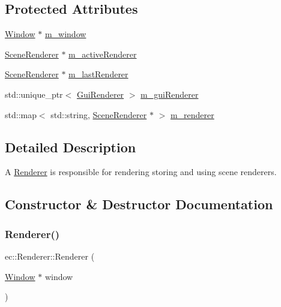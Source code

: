 \subsection*{Protected Attributes}
\begin{DoxyCompactItemize}
\item 
\mbox{\hyperlink{classec_1_1_window}{Window}} $\ast$ \mbox{\hyperlink{classec_1_1_renderer_ac23d74f9d295bf833f095bdff8c8169b}{m\+\_\+window}}
\item 
\mbox{\hyperlink{classec_1_1_scene_renderer}{Scene\+Renderer}} $\ast$ \mbox{\hyperlink{classec_1_1_renderer_a00afed952025d62a654a5f961a55b342}{m\+\_\+active\+Renderer}}
\item 
\mbox{\hyperlink{classec_1_1_scene_renderer}{Scene\+Renderer}} $\ast$ \mbox{\hyperlink{classec_1_1_renderer_a818d84064fde8088d28358f7ea04f898}{m\+\_\+last\+Renderer}}
\item 
std\+::unique\+\_\+ptr$<$ \mbox{\hyperlink{classec_1_1_gui_renderer}{Gui\+Renderer}} $>$ \mbox{\hyperlink{classec_1_1_renderer_ac5969cd9baf68b5a3a02535bc9e9dd07}{m\+\_\+gui\+Renderer}}
\item 
std\+::map$<$ std\+::string, \mbox{\hyperlink{classec_1_1_scene_renderer}{Scene\+Renderer}} $\ast$ $>$ \mbox{\hyperlink{classec_1_1_renderer_ac3f0c1c3253fbac0f734af313cc410a4}{m\+\_\+renderer}}
\end{DoxyCompactItemize}


\subsection{Detailed Description}
A \mbox{\hyperlink{classec_1_1_renderer}{Renderer}} is responsible for rendering storing and using scene renderers. 

\subsection{Constructor \& Destructor Documentation}
\mbox{\label{classec_1_1_renderer_a97bc5e3d5050aa98a24fec3669eab28b}} 
\subsubsection{\texorpdfstring{Renderer()}{Renderer()}}
{\footnotesize\ttfamily ec\+::\+Renderer\+::\+Renderer (\begin{DoxyParamCaption}\item[{\mbox{\hyperlink{classec_1_1_window}{Window}} $\ast$}]{window }\end{DoxyParamCaption})\hspace{0.3cm}{\ttfamily [explicit]}}


